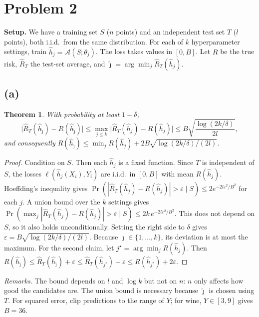 \documentclass[11pt]{article}
\newtheorem*{theorem*}{Theorem}
\begin{document}
\section*{Problem 2}

\noindent\textbf{Setup.} We have a training set $S$ ($n$ points) and an independent test set $T$ ($l$ points),
both i.i.d.\ from the same distribution. For each of $k$ hyperparameter settings, train
$\hat h_j=\mathcal A(S;\theta_j)$. The loss takes values in $[0,B]$. Let $R$ be the true risk,
$\hat R_T$ the test-set average, and $\hat\jmath=\arg\min_j\hat R_T(\hat h_j)$.

\subsection*{(a)}
\begin{theorem*}
With probability at least $1-\delta$,
\[
  \big|\hat R_T(\hat h_{\hat\jmath}) - R(\hat h_{\hat\jmath})\big|
  \le \max_{j\le k}\big|\hat R_T(\hat h_j) - R(\hat h_j)\big|
  \le B\sqrt{\frac{\log(2k/\delta)}{2l}} ,
\]
and consequently $R(\hat h_{\hat\jmath})\le \min_j R(\hat h_j)+2B\sqrt{\log(2k/\delta)/(2l)}$.
\end{theorem*}

\begin{proof}
Condition on $S$. Then each $\hat h_j$ is a fixed function. Since $T$ is independent of $S$, the losses
$\ell(\hat h_j(X_i),Y_i)$ are i.i.d.\ in $[0,B]$ with mean $R(\hat h_j)$. Hoeffding's inequality gives
$\Pr(|\hat R_T(\hat h_j)-R(\hat h_j)|>\varepsilon\mid S)\le 2e^{-2l\varepsilon^2/B^2}$ for each $j$. A union
bound over the $k$ settings gives
$\Pr(\max_j|\hat R_T(\hat h_j)-R(\hat h_j)|>\varepsilon\mid S)\le 2k\,e^{-2l\varepsilon^2/B^2}$. This does not
depend on $S$, so it also holds unconditionally. Setting the right side to $\delta$ gives
$\varepsilon=B\sqrt{\log(2k/\delta)/(2l)}$. Because $\hat\jmath\in\{1,\dots,k\}$, its deviation is at most
the maximum. For the second claim, let $j^\star=\arg\min_jR(\hat h_j)$. Then
$R(\hat h_{\hat\jmath})\le\hat R_T(\hat h_{\hat\jmath})+\varepsilon\le\hat R_T(\hat h_{j^\star})+\varepsilon\le R(\hat h_{j^\star})+2\varepsilon$.
\end{proof}

\noindent\emph{Remarks.} The bound depends on $l$ and $\log k$ but not on $n$: $n$ only affects how good
the candidates are. The union bound is necessary because $\hat\jmath$ is chosen using $T$. For squared
error, clip predictions to the range of $Y$; for wine, $Y\in[3,9]$ gives $B=36$.
\end{document}
